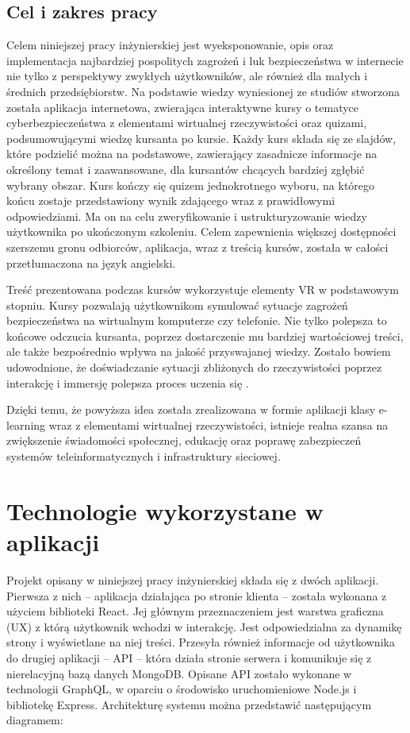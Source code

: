 \documentclass[12pt,twoside]{article}
\begin{document}
\subsection{Cel i zakres pracy}

Celem niniejszej pracy inżynierskiej jest wyeksponowanie, opis oraz implementacja najbardziej pospolitych zagrożeń i luk bezpieczeństwa w internecie nie tylko z perspektywy zwykłych użytkowników, ale również dla małych i średnich przedsiębiorstw. Na podstawie wiedzy wyniesionej ze studiów stworzona została aplikacja internetowa, zwierająca interaktywne kursy o tematyce cyberbezpieczeństwa z elementami wirtualnej rzeczywistości oraz quizami, podsumowującymi wiedzę kursanta po kursie. Każdy kurs składa się ze slajdów, które podzielić można na podstawowe, zawierający zasadnicze informacje na określony temat i zaawansowane, dla kursantów chcących bardziej zgłębić wybrany obszar. Kurs kończy się quizem jednokrotnego wyboru, na którego końcu zostaje przedstawiony wynik zdającego wraz z prawidłowymi odpowiedziami. Ma on na celu zweryfikowanie i ustrukturyzowanie wiedzy użytkownika po ukończonym szkoleniu. Celem zapewnienia większej dostępności szerszemu gronu odbiorców, aplikacja, wraz z treścią kursów, została w całości przetłumaczona na język angielski.

Treść prezentowana podczas kursów wykorzystuje elementy VR w podstawowym stopniu. Kursy pozwalają użytkownikom symulować sytuacje zagrożeń bezpieczeństwa na wirtualnym komputerze czy telefonie. Nie tylko polepsza to końcowe odczucia kursanta, poprzez dostarczenie mu bardziej wartościowej treści, ale także bezpośrednio wpływa na jakość przyswajanej wiedzy. Zostało bowiem udowodnione, że doświadczanie sytuacji zbliżonych do rzeczywistości poprzez interakcję i immersję polepsza proces uczenia się \cite{VrLearning}. 

Dzięki temu, że powyższa idea została zrealizowana w formie aplikacji klasy e-learning wraz z elementami wirtualnej rzeczywistości, istnieje realna szansa na zwiększenie świadomości społecznej, edukację oraz poprawę zabezpieczeń systemów teleinformatycznych i infrastruktury sieciowej.

\clearpage

\section{Technologie wykorzystane w aplikacji}

Projekt opisany w niniejszej pracy inżynierskiej składa się z dwóch aplikacji. Pierwsza z nich -- aplikacja działająca po stronie klienta -- została wykonana z użyciem biblioteki React. Jej głównym przeznaczeniem jest warstwa graficzna (UX) z którą użytkownik wchodzi w interakcję. Jest odpowiedzialna za dynamikę strony i wyświetlane na niej treści. Przesyła również informacje od użytkownika do drugiej aplikacji -- API -- która działa stronie serwera i komunikuje się z nierelacyjną bazą danych MongoDB. Opisane API zostało wykonane w technologii GraphQL, w oparciu o środowisko uruchomieniowe Node.js i bibliotekę Express. Architekturę systemu można przedstawić następującym diagramem:
\end{document}
